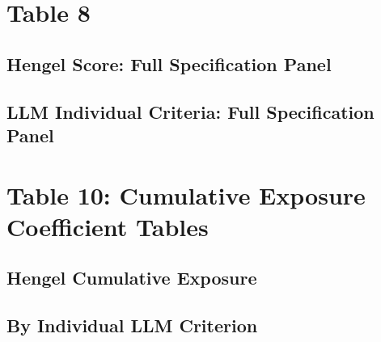 \clearpage

\section{Table 8}\label{app:sec:table8}

\subsection{Hengel Score: Full Specification Panel}\label{app:sec:table8_hengel}








\clearpage

\subsection{LLM Individual Criteria: Full Specification Panel}\label{app:sec:table8_llm_ind}














\clearpage

\section{Table 10: Cumulative Exposure Coefficient Tables}\label{app:sec:table10}

\subsection{Hengel Cumulative Exposure}\label{app:sec:table10_composite}



\clearpage

\subsection{By Individual LLM Criterion}\label{app:sec:table10_individual}


